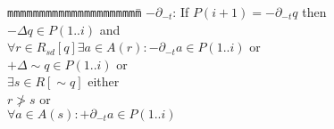 
\begin{tabbing}
{\tt mmm}\={\tt mmmmmm}\={\tt mmmm}\={\tt mmmm}\={\tt mmmm}\=\kill
\>$- \partial_{-t}$: If $P(i+1) = - \partial_{-t} q$ then \\
\>\>$- \Delta q \in P(1..i)$ and \\
\>\>\>$\forall r \in R_{sd}[q] \exists a \in A(r): - \partial_{-t} a \in P(1..i)$ or \\
\>\>\>$+ \Delta \sim q \in P(1..i)$ or \\
\>\>\>$\exists s \in R[\sim q]$ either \\
\>\>\>\>$r \not> s$ or \\
\>\>\>\>$\forall a \in A(s): + \partial_{-t} a \in P(1..i)$
\end{tabbing}

